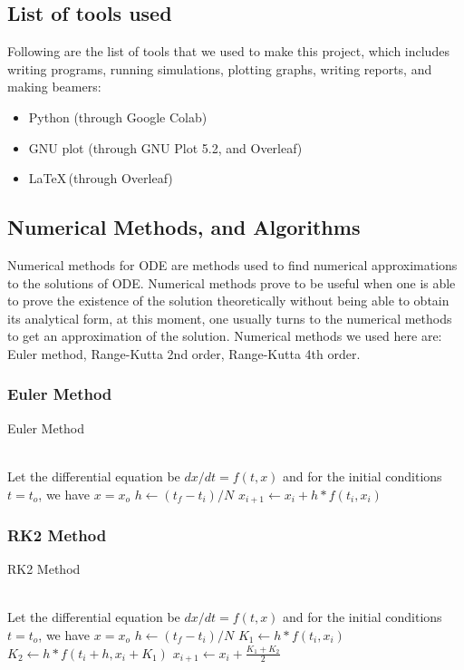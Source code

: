 \documentclass[12pt]{article}
\begin{document}
\subsection{List of tools used}
Following are the list of tools that we used to make this project, which includes writing programs, running simulations, plotting graphs, writing reports, and making beamers:
\begin{itemize}
    \item Python (through Google Colab)
    \item GNU plot (through GNU Plot 5.2, and Overleaf)
    \item \LaTeX \,(through Overleaf)
\end{itemize}
\subsection{Numerical Methods, and Algorithms}
    Numerical methods for ODE are methods used to find numerical approximations to the solutions of ODE. Numerical methods prove to be useful when one is able to prove the existence of the solution theoretically without being able to obtain its analytical form,  at this moment, one usually turns to the numerical methods to get an approximation of the solution. Numerical methods we used here are: Euler method, Range-Kutta 2nd order, Range-Kutta 4th order. 
    \subsubsection{Euler Method}
    \begin{algorithm}[H]
  \caption{Euler Method}
  \begin{algorithmic}
    \\
    \Comment Let the differential equation be $dx/dt = f(t,x)$ and for the initial conditions $t=t_o$, we have $x=x_o$
    \State $h \gets (t_f - t_i)/N$
        \State \texttt{$x_{i+1} \gets x_i + h*f(t_i, x_i)$}
      \EndFor
    \EndProcedure
  \end{algorithmic}
\end{algorithm}
    \subsubsection{RK2 Method}
    \begin{algorithm}[H]
  \caption{RK2 Method}
  \begin{algorithmic}
    \\
    \Comment Let the differential equation be $dx/dt = f(t,x)$ and for the initial conditions $t=t_o$, we have $x=x_o$
    \State $h \gets (t_f - t_i)/N$
     \State $K_1 \gets h*f(t_i, x_i)$
     \State $K_2 \gets h*f(t_i + h, x_i + K_1)$
        \State \texttt{$x_{i+1} \gets x_i + \frac{K_1 + K_2}{2}$}
      \EndFor
    \EndProcedure
  \end{algorithmic}
\end{algorithm}
\end{document}

